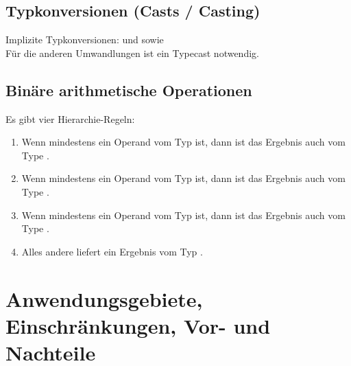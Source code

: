 \subsection{Typkonversionen (Casts / Casting)}
Implizite Typkonversionen:
 und 
sowie \\
Für die anderen Umwandlungen ist ein  Typecast notwendig.

\subsection{Binäre arithmetische Operationen}
Es gibt vier Hierarchie-Regeln:
\begin{enumerate}[label=(\arabic*)]
	\item Wenn mindestens ein Operand vom Typ  ist, dann ist das Ergebnis auch vom Type .
	\item Wenn mindestens ein Operand vom Typ  ist, dann ist das Ergebnis auch vom Type .
	\item Wenn mindestens ein Operand vom Typ  ist, dann ist das Ergebnis auch vom Type .
	\item Alles andere liefert ein Ergebnis vom Typ .
\end{enumerate}


\section{Anwendungsgebiete, Einschränkungen, Vor- und Nachteile}



